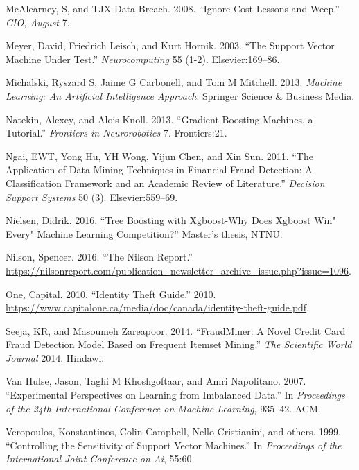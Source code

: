 \documentclass[12pt,]{article}
\begin{document}
\leavevmode\hypertarget{ref-mcalearney2008ignore}{}%
McAlearney, S, and TJX Data Breach. 2008. ``Ignore Cost Lessons and
Weep.'' \emph{CIO, August} 7.

\leavevmode\hypertarget{ref-meyer2003support}{}%
Meyer, David, Friedrich Leisch, and Kurt Hornik. 2003. ``The Support
Vector Machine Under Test.'' \emph{Neurocomputing} 55 (1-2).
Elsevier:169--86.

\leavevmode\hypertarget{ref-michalski2013machine}{}%
Michalski, Ryszard S, Jaime G Carbonell, and Tom M Mitchell. 2013.
\emph{Machine Learning: An Artificial Intelligence Approach}. Springer
Science \& Business Media.

\leavevmode\hypertarget{ref-natekin2013gradient}{}%
Natekin, Alexey, and Alois Knoll. 2013. ``Gradient Boosting Machines, a
Tutorial.'' \emph{Frontiers in Neurorobotics} 7. Frontiers:21.

\leavevmode\hypertarget{ref-ngai2011application}{}%
Ngai, EWT, Yong Hu, YH Wong, Yijun Chen, and Xin Sun. 2011. ``The
Application of Data Mining Techniques in Financial Fraud Detection: A
Classification Framework and an Academic Review of Literature.''
\emph{Decision Support Systems} 50 (3). Elsevier:559--69.

\leavevmode\hypertarget{ref-nielsen2016tree}{}%
Nielsen, Didrik. 2016. ``Tree Boosting with Xgboost-Why Does Xgboost
Win" Every" Machine Learning Competition?'' Master's thesis, NTNU.

\leavevmode\hypertarget{ref-nilson2016nilson}{}%
Nilson, Spencer. 2016. ``The Nilson Report.''
\url{https://nilsonreport.com/publication_newsletter_archive_issue.php?issue=1096}.

\leavevmode\hypertarget{ref-capitaloneguide}{}%
One, Capital. 2010. ``Identity Theft Guide.'' 2010.
\url{https://www.capitalone.ca/media/doc/canada/identity-theft-guide.pdf}.

\leavevmode\hypertarget{ref-seeja2014fraudminer}{}%
Seeja, KR, and Masoumeh Zareapoor. 2014. ``FraudMiner: A Novel Credit
Card Fraud Detection Model Based on Frequent Itemset Mining.'' \emph{The
Scientific World Journal} 2014. Hindawi.

\leavevmode\hypertarget{ref-van2007experimental}{}%
Van Hulse, Jason, Taghi M Khoshgoftaar, and Amri Napolitano. 2007.
``Experimental Perspectives on Learning from Imbalanced Data.'' In
\emph{Proceedings of the 24th International Conference on Machine
Learning}, 935--42. ACM.

\leavevmode\hypertarget{ref-veropoulos1999controlling}{}%
Veropoulos, Konstantinos, Colin Campbell, Nello Cristianini, and others.
1999. ``Controlling the Sensitivity of Support Vector Machines.'' In
\emph{Proceedings of the International Joint Conference on Ai}, 55:60.
\end{document}
